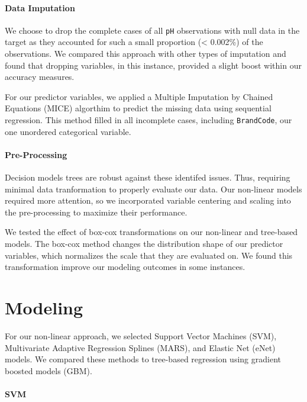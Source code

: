 \documentclass[]{report}
\begin{document}
\hypertarget{data-imputation}{%
\subsubsection{Data Imputation}\label{data-imputation}}

We choose to drop the complete cases of all \texttt{pH} observations
with null data in the target as they accounted for such a small
proportion (\textless{} 0.002\%) of the observations. We compared this
approach with other types of imputation and found that dropping
variables, in this instance, provided a slight boost within our accuracy
measures.

For our predictor variables, we applied a Multiple Imputation by Chained
Equations (MICE) algorthim to predict the missing data using sequential
regression. This method filled in all incomplete cases, including
\texttt{BrandCode}, our one unordered categorical variable.

\hypertarget{pre-processing}{%
\subsubsection{Pre-Processing}\label{pre-processing}}

Decision models trees are robust against these identifed issues. Thus,
requiring minimal data tranformation to properly evaluate our data. Our
non-linear models required more attention, so we incorporated variable
centering and scaling into the pre-processing to maximize their
performance.

We tested the effect of box-cox transformations on our non-linear and
tree-based models. The box-cox method changes the distribution shape of
our predictor variables, which normalizes the scale that they are
evaluated on. We found this transformation improve our modeling outcomes
in some instances.

\hypertarget{modeling}{%
\chapter{Modeling}\label{modeling}}

For our non-linear approach, we selected Support Vector Machines (SVM),
Multivariate Adaptive Regression Splines (MARS), and Elastic Net (eNet)
models. We compared these methods to tree-based regression using
gradient boosted models (GBM).

\hypertarget{svm}{%
\subsubsection{SVM}\label{svm}}
\end{document}
